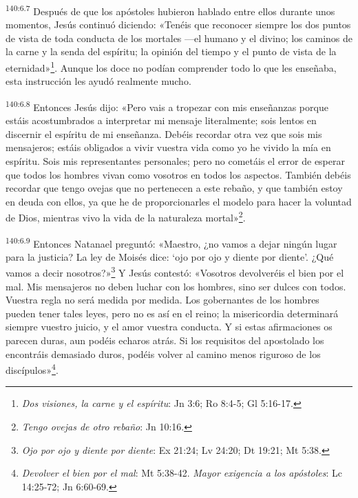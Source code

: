 \par
\textsuperscript{140:6.7} Después de que los apóstoles hubieron hablado entre ellos durante unos momentos, Jesús continuó diciendo: «Tenéis que reconocer siempre los dos puntos de vista de toda conducta de los mortales ---el humano y el divino; los caminos de la carne y la senda del espíritu; la opinión del tiempo y el punto de vista de la eternidad»\footnote{\textit{Dos visiones, la carne y el espíritu}: Jn 3:6; Ro 8:4-5; Gl 5:16-17.}. Aunque los doce no podían comprender todo lo que les enseñaba, esta instrucción les ayudó realmente mucho.

\par
\textsuperscript{140:6.8} Entonces Jesús dijo: «Pero vais a tropezar con mis enseñanzas porque estáis acostumbrados a interpretar mi mensaje literalmente; sois lentos en discernir el espíritu de mi enseñanza. Debéis recordar otra vez que sois mis mensajeros; estáis obligados a vivir vuestra vida como yo he vivido la mía en espíritu. Sois mis representantes personales; pero no cometáis el error de esperar que todos los hombres vivan como vosotros en todos los aspectos. También debéis recordar que tengo ovejas que no pertenecen a este rebaño, y que también estoy en deuda con ellos, ya que he de proporcionarles el modelo para hacer la voluntad de Dios, mientras vivo la vida de la naturaleza mortal»\footnote{\textit{Tengo ovejas de otro rebaño}: Jn 10:16.}.

\par
\textsuperscript{140:6.9} Entonces Natanael preguntó: «Maestro, ¿no vamos a dejar ningún lugar para la justicia? La ley de Moisés dice: `ojo por ojo y diente por diente'. ¿Qué vamos a decir nosotros?»\footnote{\textit{Ojo por ojo y diente por diente}: Ex 21:24; Lv 24:20; Dt 19:21; Mt 5:38.} Y Jesús contestó: «Vosotros devolveréis el bien por el mal. Mis mensajeros no deben luchar con los hombres, sino ser dulces con todos. Vuestra regla no será medida por medida. Los gobernantes de los hombres pueden tener tales leyes, pero no es así en el reino; la misericordia determinará siempre vuestro juicio, y el amor vuestra conducta. Y si estas afirmaciones os parecen duras, aun podéis echaros atrás. Si los requisitos del apostolado los encontráis demasiado duros, podéis volver al camino menos riguroso de los discípulos»\footnote{\textit{Devolver el bien por el mal}: Mt 5:38-42. \textit{Mayor exigencia a los apóstoles}: Lc 14:25-72; Jn 6:60-69.}.

